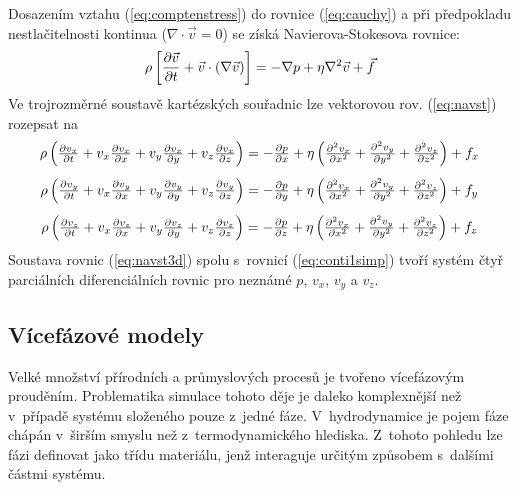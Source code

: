 Dosazením vztahu (\ref{eq:comptenstress}) do rovnice (\ref{eq:cauchy}) a při předpokladu nestlačitelnosti kontinua ($\nabla \cdot \vec{v} = 0$) se získá Navierova-Stokesova rovnice:
\begin{equation}
    \rho \left[ \frac{\partial \vec{v}}{\partial t} + \vec{v} \cdot \left( \nabla  \vec{v} \right) \right] = -\nabla p + \eta \nabla^{2}\vec{v}  + \vec{f}
  	\label{eq:navst}
\end{equation} 
Ve trojrozměrné soustavě kartézských souřadnic lze vektorovou rov. (\ref{eq:navst}) rozepsat na 
\begin{equation}
\begin{array}{c}
    \rho \left( \frac{\partial v_{x}}{\partial t} + v_{x}\frac{\partial v_{x}}{\partial x} + v_{y}\frac{\partial v_{x}}{\partial y} + v_{z}\frac{\partial v_{x}}{\partial z} \right) = -\frac{\partial p}{\partial x} +  \eta \left( \frac{\partial^{2} v_{x}}{\partial x^{2}} + \frac{\partial^{2} v_{y}}{\partial y^{2}} + \frac{\partial^{2} v_{z}}{\partial z^{2}} \right) + f_{x}   \vspace{3mm} \\
    
    \rho \left( \frac{\partial v_{y}}{\partial t} + v_{x}\frac{\partial v_{y}}{\partial x} + v_{y}\frac{\partial v_{y}}{\partial y} + v_{z}\frac{\partial v_{y}}{\partial z} \right) = -\frac{\partial p}{\partial y} +  \eta \left( \frac{\partial^{2} v_{x}}{\partial x^{2}} + \frac{\partial^{2} v_{y}}{\partial y^{2}} + \frac{\partial^{2} v_{z}}{\partial z^{2}} \right) + f_{y}   \vspace{3mm} \\
    
    \rho \left( \frac{\partial v_{z}}{\partial t} + v_{x}\frac{\partial v_{z}}{\partial x} + v_{y}\frac{\partial v_{z}}{\partial y} + v_{z}\frac{\partial v_{z}}{\partial z} \right) = -\frac{\partial p}{\partial z} +  \eta \left( \frac{\partial^{2} v_{x}}{\partial x^{2}} + \frac{\partial^{2} v_{y}}{\partial y^{2}} + \frac{\partial^{2} v_{z}}{\partial z^{2}} \right) + f_{z}   \\
    \end{array}
  	\label{eq:navst3d}
\end{equation} 
Soustava rovnic (\ref{eq:navst3d}) spolu s~rovnicí (\ref{eq:conti1simp}) tvoří systém čtyř parciálních diferenciálních rovnic pro neznámé $p$, $v_{x}$, $v_{y}$ a $v_{z}$. 

\subsection{Vícefázové modely}
Velké množství přírodních a průmyslových procesů je tvořeno vícefázovým prouděním. Problematika simulace tohoto děje je daleko komplexnější než v~případě systému slo\-že\-né\-ho pouze z~jedné fáze. V~hydrodynamice je pojem fáze chápán v~širším smyslu než z~termodynamického hlediska. Z~tohoto pohledu lze fázi definovat jako třídu materiálu, jenž interaguje určitým způsobem s~dalšími částmi systému. 

